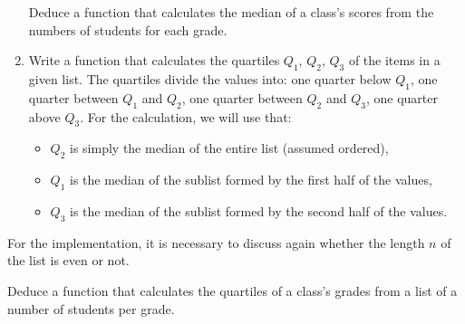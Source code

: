 \documentclass[11pt,class=report,crop=false]{standalone}
\begin{document}
\begin{activite}
\begin{enumerate}

       
    Deduce a function that calculates the median of a class's scores from the numbers of students for each grade.
    
    \item Write a function  that calculates the quartiles $Q_1$, $Q_2$, $Q_3$ of the items in a given list. The quartiles divide the values into: one quarter below $Q_1$, one quarter between $Q_1$ and $Q_2$, one quarter between $Q_2$ and $Q_3$, one quarter above $Q_3$.
    For the calculation, we will use that:
    \begin{itemize}
      \item $Q_2$ is simply the median of the entire list (assumed ordered),
      \item $Q_1$ is the median of the sublist formed by the first half of the values,
      \item $Q_3$ is the median of the sublist formed by the second half of the values. 
    \end{itemize}           
\end{enumerate}

  For the implementation, it is necessary to discuss again whether the length $n$ of the list is even or not.
  
  Deduce a function that calculates the quartiles of a class's grades from a list of a number of students per grade.

\end{activite}


\end{document}
